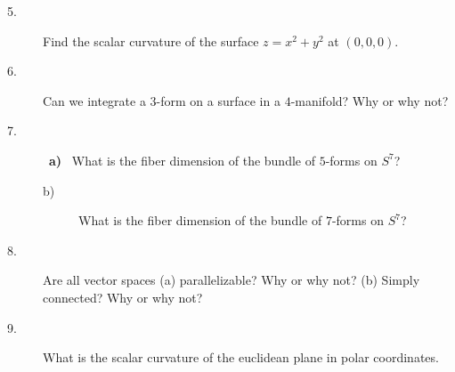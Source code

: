 \documentclass[12pt,bbb]{report}
\begin{document}
\begin{description}
\item[5.] Find the scalar curvature of the surface  $z = x^2 + y^2$  at
$(0, 0, 0)$.


\item[6.] Can we integrate a  $3$-form on a surface in a  $4$-manifold?
Why or why not?


\item[7.] \ {\bf a)} \ What is the fiber dimension of the bundle of
$5$-forms on  $S^7$?

\begin{description}

\item[b)] What is the fiber dimension of the bundle of  $7$-forms on
$S^7$?

\end{description}

\item[8.] Are all vector spaces (a) parallelizable?  Why or why not?
(b) Simply connected?  Why or why not?


\item[9.] What is the scalar curvature of the euclidean plane in polar
coordinates.


\end{description}


\end{document}
